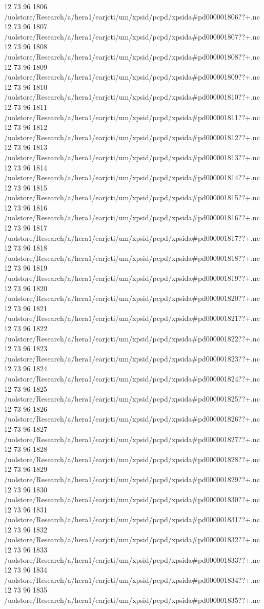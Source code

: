 12 73 96
1806
/uolstore/Research/a/hera1/earjcti/um/xpsid/pcpd/xpsida#pd000001806??+.nc
12 73 96
1807
/uolstore/Research/a/hera1/earjcti/um/xpsid/pcpd/xpsida#pd000001807??+.nc
12 73 96
1808
/uolstore/Research/a/hera1/earjcti/um/xpsid/pcpd/xpsida#pd000001808??+.nc
12 73 96
1809
/uolstore/Research/a/hera1/earjcti/um/xpsid/pcpd/xpsida#pd000001809??+.nc
12 73 96
1810
/uolstore/Research/a/hera1/earjcti/um/xpsid/pcpd/xpsida#pd000001810??+.nc
12 73 96
1811
/uolstore/Research/a/hera1/earjcti/um/xpsid/pcpd/xpsida#pd000001811??+.nc
12 73 96
1812
/uolstore/Research/a/hera1/earjcti/um/xpsid/pcpd/xpsida#pd000001812??+.nc
12 73 96
1813
/uolstore/Research/a/hera1/earjcti/um/xpsid/pcpd/xpsida#pd000001813??+.nc
12 73 96
1814
/uolstore/Research/a/hera1/earjcti/um/xpsid/pcpd/xpsida#pd000001814??+.nc
12 73 96
1815
/uolstore/Research/a/hera1/earjcti/um/xpsid/pcpd/xpsida#pd000001815??+.nc
12 73 96
1816
/uolstore/Research/a/hera1/earjcti/um/xpsid/pcpd/xpsida#pd000001816??+.nc
12 73 96
1817
/uolstore/Research/a/hera1/earjcti/um/xpsid/pcpd/xpsida#pd000001817??+.nc
12 73 96
1818
/uolstore/Research/a/hera1/earjcti/um/xpsid/pcpd/xpsida#pd000001818??+.nc
12 73 96
1819
/uolstore/Research/a/hera1/earjcti/um/xpsid/pcpd/xpsida#pd000001819??+.nc
12 73 96
1820
/uolstore/Research/a/hera1/earjcti/um/xpsid/pcpd/xpsida#pd000001820??+.nc
12 73 96
1821
/uolstore/Research/a/hera1/earjcti/um/xpsid/pcpd/xpsida#pd000001821??+.nc
12 73 96
1822
/uolstore/Research/a/hera1/earjcti/um/xpsid/pcpd/xpsida#pd000001822??+.nc
12 73 96
1823
/uolstore/Research/a/hera1/earjcti/um/xpsid/pcpd/xpsida#pd000001823??+.nc
12 73 96
1824
/uolstore/Research/a/hera1/earjcti/um/xpsid/pcpd/xpsida#pd000001824??+.nc
12 73 96
1825
/uolstore/Research/a/hera1/earjcti/um/xpsid/pcpd/xpsida#pd000001825??+.nc
12 73 96
1826
/uolstore/Research/a/hera1/earjcti/um/xpsid/pcpd/xpsida#pd000001826??+.nc
12 73 96
1827
/uolstore/Research/a/hera1/earjcti/um/xpsid/pcpd/xpsida#pd000001827??+.nc
12 73 96
1828
/uolstore/Research/a/hera1/earjcti/um/xpsid/pcpd/xpsida#pd000001828??+.nc
12 73 96
1829
/uolstore/Research/a/hera1/earjcti/um/xpsid/pcpd/xpsida#pd000001829??+.nc
12 73 96
1830
/uolstore/Research/a/hera1/earjcti/um/xpsid/pcpd/xpsida#pd000001830??+.nc
12 73 96
1831
/uolstore/Research/a/hera1/earjcti/um/xpsid/pcpd/xpsida#pd000001831??+.nc
12 73 96
1832
/uolstore/Research/a/hera1/earjcti/um/xpsid/pcpd/xpsida#pd000001832??+.nc
12 73 96
1833
/uolstore/Research/a/hera1/earjcti/um/xpsid/pcpd/xpsida#pd000001833??+.nc
12 73 96
1834
/uolstore/Research/a/hera1/earjcti/um/xpsid/pcpd/xpsida#pd000001834??+.nc
12 73 96
1835
/uolstore/Research/a/hera1/earjcti/um/xpsid/pcpd/xpsida#pd000001835??+.nc
